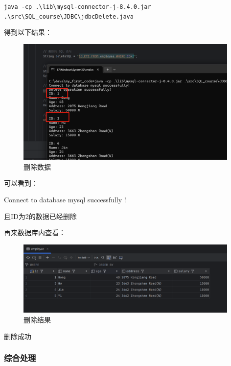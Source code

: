 \documentclass{article}
\begin{document}
	\verb|java -cp .\lib\mysql-connector-j-8.4.0.jar .\src\SQL_course\JDBC\jdbcDelete.java|
	
	得到以下结果：
	
	\begin{figure}[H]
		\centering
		\includegraphics[width=11cm]{./images/12.删除数据.png}
		\caption{删除数据}
	\end{figure}
	
	可以看到：
	
	Connect to database mysql successfully !
	
	且ID为2的数据已经删除
	
	再来数据库内查看：
	
	\begin{figure}[H]
		\centering
		\includegraphics[width=11cm]{./images/13.删除结果.png}
		\caption{删除结果}
	\end{figure}
	
	删除成功
	
	\subsubsection{综合处理}
	
\end{document}
